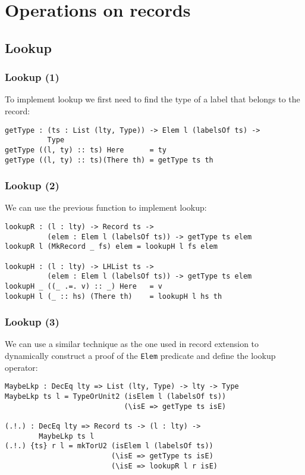 \documentclass{beamer}
\begin{document}
\section{Operations on records}

\subsection{Lookup}

\begin{frame}[fragile]
\frametitle{Lookup (1)}

To implement lookup we first need to find the type of a label that belongs to the record:

\begin{definition}
\begin{verbatim}
getType : (ts : List (lty, Type)) -> Elem l (labelsOf ts) -> 
          Type
getType ((l, ty) :: ts) Here      = ty
getType ((l, ty) :: ts)(There th) = getType ts th
\end{verbatim}
\end{definition}

\end{frame}

\begin{frame}[fragile]
\frametitle{Lookup (2)}

We can use the previous function to implement lookup:

\begin{definition}
\begin{verbatim}
lookupR : (l : lty) -> Record ts -> 
          (elem : Elem l (labelsOf ts)) -> getType ts elem
lookupR l (MkRecord _ fs) elem = lookupH l fs elem

lookupH : (l : lty) -> LHList ts -> 
          (elem : Elem l (labelsOf ts)) -> getType ts elem
lookupH _ ((_ .=. v) :: _) Here   = v
lookupH l (_ :: hs) (There th)    = lookupH l hs th
\end{verbatim}
\end{definition}

\end{frame}

\begin{frame}[fragile]
\frametitle{Lookup (3)}

We can use a similar technique as the one used in record extension to dynamically construct a proof of the \texttt{Elem} predicate and define the lookup operator:

\begin{definition}
\begin{verbatim}
MaybeLkp : DecEq lty => List (lty, Type) -> lty -> Type
MaybeLkp ts l = TypeOrUnit2 (isElem l (labelsOf ts))
                            (\isE => getType ts isE)

(.!.) : DecEq lty => Record ts -> (l : lty) -> 
        MaybeLkp ts l
(.!.) {ts} r l = mkTorU2 (isElem l (labelsOf ts))
                         (\isE => getType ts isE)
                         (\isE => lookupR l r isE)
\end{verbatim}
\end{definition}

\end{frame}
\end{document}

